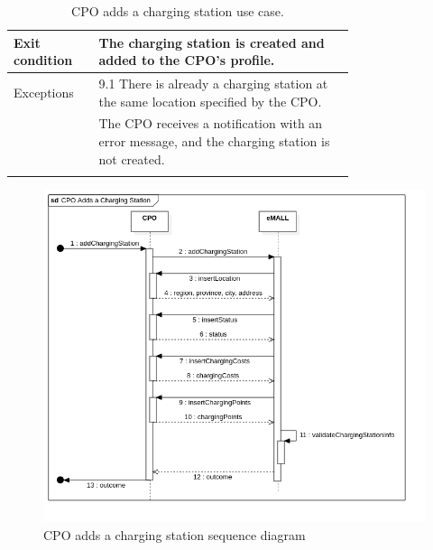 \begin{center}
\begin{longtable}{lp{0.75\linewidth}}
        \hline
        Exit condition   & The charging station is created and added to the CPO’s profile.                                           \\
        \hline
        Exceptions       & 9.1 There is already a charging station at the same location specified by the CPO.                        \\
        & The CPO receives a notification with an error message, and the charging station is not created.           \\
        \hline
        \caption{CPO adds a charging station use case.}
        \label{tab: CPO_adds_charging_station_use_case}
    \end{longtable}

    \begin{figure} [H]
        \begin{center}
            \includegraphics[width=0.9\linewidth]{Images/SequenceDiagrams/cpo_adds_a_charging_station}
            \caption{CPO adds a charging station sequence diagram}
            \label{fig: cpo_adds_station_seq_diag}
        \end{center}
    \end{figure}
\end{center}

